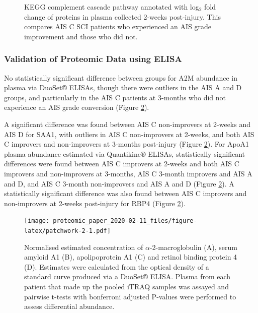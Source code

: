 \documentclass[9pt,lineno]{elife}
\begin{document}
\begin{landscape}
\begin{landscape}
\begin{figure}
{}

\caption{KEGG complement cascade pathway annotated with log\(_2\) fold change of proteins in plasma collected 2-weeks post-injury. This compares AIS C SCI patients who experienced an AIS grade improvement and those who did not.}\label{fig:kegg-complement-chap4}
\end{figure}

\hypertarget{validation-of-proteomic-data-using-elisa}{%
\subsubsection{Validation of Proteomic Data using ELISA}\label{validation-of-proteomic-data-using-elisa}}

No statistically significant difference between groups for A2M abundance in plasma via DuoSet® ELISAs, though there were outliers in the AIS A and D groups, and particularly in the AIS C patients at 3-months who did not experience an AIS grade conversion (Figure \ref{fig:patchwork-2}).

A significant difference was found between AIS C non-improvers at 2-weeks and AIS D for SAA1, with outliers in AIS C non-improvers at 2-weeks, and both AIS C improvers and non-improvers at 3-months post-injury (Figure \ref{fig:patchwork-2}).
For ApoA1 plasma abundance estimated via Quantikine® ELISAs, statistically significant differences were found between AIS C improvers at 2-weeks and both AIS C improvers and non-improvers at 3-months, AIS C 3-month improvers and AIS A and D, and AIS C 3-month non-improvers and AIS A and D (Figure \ref{fig:patchwork-2}).
A statistically significant difference was also found between AIS C improvers and non-improvers at 2-weeks post-injury for RBP4 (Figure \ref{fig:patchwork-2}).



\begin{figure}
\centering
\texttt{[image: proteomic\_paper\_2020-02-11\_files/figure-latex/patchwork-2-1.pdf]}
\caption{\label{fig:patchwork-2}Normalised estimated concentration of \(\alpha\)-2-macroglobulin (A), serum amyloid A1 (B), apolipoprotein A1 (C) and retinol binding protein 4 (D). Estimates were calculated from the optical density of a standard curve produced via a DuoSet® ELISA. Plasma from each patient that made up the pooled iTRAQ samples was assayed and pairwise t-tests with bonferroni adjusted P-values were performed to assess differential abundance.}
\end{figure}


\end{landscape}
\end{landscape}
\end{document}
